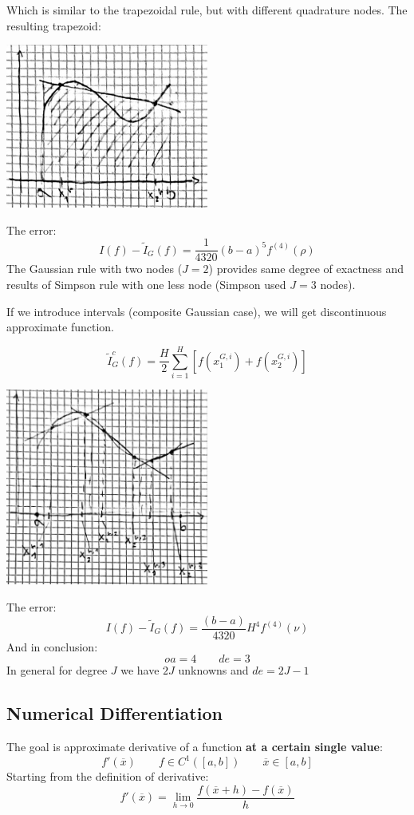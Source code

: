 Which is similar to the trapezoidal rule, but with different quadrature nodes. The resulting trapezoid:
\begin{center}
    \includegraphics[width=0.5\textwidth]{images/gaussian_quad1.png}
\end{center}
The error:
$$
I(f)-\tilde{I}_G(f)=\frac{1}{4320}(b-a)^5f^{(4)}(\rho)
$$
The Gaussian rule with two nodes ($J=2$) provides same degree of exactness and results of Simpson rule with one less node (Simpson used $J=3$ nodes).

If we introduce intervals (composite Gaussian case), we will get discontinuous approximate function.

\begin{LARGE}
    $$
    \tilde{I}_G^c(f)=\frac{H}{2}
    \sum_{i=1}^H
    \left[
        f(x_1^{G,i})+
        f(x_2^{G,i})
    \right]
    $$
\end{LARGE}
\begin{center}
    \includegraphics[width=0.5\textwidth]{images/gaussian_quad2.png}
\end{center}
The error:
$$
I(f)-\tilde{I}_G(f)=\frac{(b-a)}{4320}H^4f^{(4)}(\nu)
$$
And in conclusion:
$$
oa=4\qquad de=3
$$
In general for degree $J$ we have $2J$ unknowns and $de=2J-1$

\subsection{Numerical Differentiation}
The goal is approximate derivative of a function \textbf{at a certain single value}:
$$
f'(\overline{x})\qquad f\in C^1\left([a,b]\right)\qquad\overline{x}\in [a,b]
$$
Starting from the definition of derivative:
$$
f'(\overline{x})=\lim_{h\rightarrow 0}
\frac{
    f(\overline{x}+h)-f(\overline{x})
}{h}
$$
